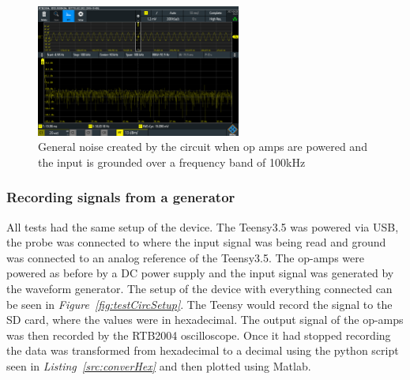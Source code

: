 \begin{figure}[h]
    \centering
    \includegraphics[width=0.6\textwidth]{graphics/NoiseFloor100k.PNG}
    \caption{General noise created by the circuit when op amps are powered and the input is grounded over a frequency band of 100kHz}
    \label{fig:noisefloor100k}
\end{figure}




\subsubsection{Recording signals from a generator}

All tests had the same setup of the device.
The Teensy3.5 was powered via USB, the probe was connected to where the input signal was being read and ground was connected to an analog reference of the Teensy3.5.
The op-amps were powered as before by a DC power supply and the input signal was generated by the waveform generator.
The setup of the device with everything connected can be seen in \textit{Figure~\ref{fig:testCircSetup}}.
The Teensy would record the signal to the SD card, where the values were in hexadecimal.
The output signal of the op-amps was then recorded by the RTB2004 oscilloscope.
Once it had stopped recording the data was transformed from hexadecimal to a decimal using the python script seen in \textit{Listing~\ref{src:converHex}} and then plotted using Matlab.



